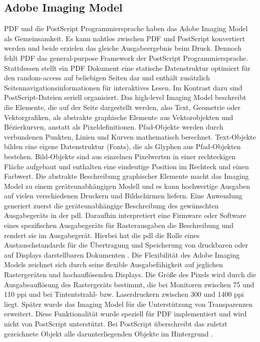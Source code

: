 \subsection{Adobe Imaging Model}
PDF und die PostScript Programmiersprache haben das Adobe Imaging Model als Gemeinsamkeit. Es kann nahtlos zwischen PDF und PostScript konvertiert werden und beide erzielen das gleiche Ausgabeergebnis beim Druck. Dennoch fehlt PDF das general-purpose Framework der PostScript Programmiersprache. Stattdessen stellt ein PDF Dokument eine statische Datenstruktur optimiert für den random-access auf beliebigen Seiten dar und enthält zusätzlich Seitennavigationsinformationen für interaktives Lesen. Im Kontrast dazu sind PostScript-Dateien seriell organisiert. Das high-level Imaging Model beschreibt die Elemente, die auf der Seite dargestellt werden, also Text, Geometrie oder Vektorgrafiken, als abstrakte graphische Elemente aus Vektorobjekten und Bézierkurven, anstatt als Pixeldefinitionen. Pfad-Objekte werden durch verbundenen Punkten, Linien und Kurven mathematisch berechnet. Text-Objekte bilden eine eigene Datenstruktur (Fonts), die als Glyphen aus Pfad-Objekten bestehen. Bild-Objekte sind aus einzelnen Pixelwerten in einer rechteckigen Fläche aufgebaut und enthalten eine eindeutige Position im Rechteck und einen Farbwert. Die abstrakte Beschreibung graphischer Elemente macht das Imaging Model zu einem geräteunabhängigen Modell und es kann hochwertige Ausgaben auf vielen verschiedenen Druckern und Bildschirmen liefern. Eine Anwendung generiert zuerst die geräteunabhängige Beschreibung des gewünschten Ausgabegeräts in der \gls{pdl}. Daraufhin interpretiert eine Firmware oder Software eines spezifischen Ausgabegeräts für Rasterausgaben die Beschreibung und rendert sie im Ausgabegerät. Hierbei hat die \gls{pdl} die Rolle eines Austauschstandards für die Übertragung und Speicherung von druckbaren oder auf Displays darstellbaren Dokumenten \cite{adobe-postscript}. Die Flexibilität des Adobe Imaging Models zeichnet sich durch seine flexible Ausgabefähigkeit auf jeglichen Rastergeräten und hochauflösenden Displays. Die Größe des Pixels wird durch die Ausgabeauflösung des Rastergeräts bestimmt, die bei Monitoren zwischen 75 und 110 \gls{ppi} und bei Tintentstrahl- bzw. Laserdruckern zwischen 300 und 1400 \gls{ppi} liegt. Später wurde das Imaging Model für die Unterstützung von Transparenzen erweitert. Diese Funktionalität wurde speziell für PDF implementiert und wird nicht von PostScript unterstützt. Bei PostScript überschreibt das zuletzt gezeichnete Objekt alle darunterliegenden Objekte im Hintergrund \cite{schneeberger}. 

